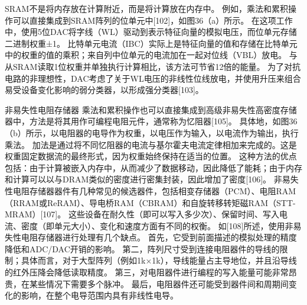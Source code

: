 SRAM不是将内存放在计算附近，而是将计算放在内存中。
例如，乘法和累积操作可以直接集成到SRAM阵列的位单元中[102]，如图36（a）所示。
在这项工作中，使用5位DAC将字线（WL）驱动到表示特征向量的模拟电压，而位单元存储二进制权重±1。
比特单元电流（IBC）实际上是特征向量的值和存储在比特单元中的权重的值的乘积；来自列中位单元的电流加在一起对位线（VBL）放电。
与从SRAM读取1位权重并单独执行计算相比，该方法可节省12倍的能量。
为了对抗电路的非理想性，DAC考虑了关于WL电压的非线性位线放电，并使用升压来组合易受设备变化影响的弱分类器，以形成强分类器[103]。

非易失性电阻存储器
乘法和累积操作也可以直接集成到高级非易失性高密度存储器中，方法是将其用作可编程电阻元件，通常称为忆阻器[105]。
具体地，如图36（b）所示，以电阻器的电导作为权重，以电压作为输入，以电流作为输出，执行乘法。
加法是通过将不同忆阻器的电流与基尔霍夫电流定律相加来完成的。这是权重固定数据流的最终形式，因为权重始终保持在适当的位置。
这种方法的优点包括：由于计算被嵌入内存中，从而减少了数据移动，因此降低了能耗；由于内存和计算可以以与DRAM类似的密度进行密集封装，因此增加了密度[106]。
非易失性电阻存储器器件有几种常见的候选器件，包括相变存储器（PCM）、电阻RAM（RRAM或ReRAM）、导电桥RAM（CBRAM）和自旋转移转矩磁RAM（STT-MRAM）[107]。
这些设备在耐久性（即可以写入多少次）、保留时间、写入电流、密度（即单元大小）、变化和速度方面有不同的权衡。
如[108]所述，使用非易失性电阻存储器进行处理有几个缺点。
首先，它受到前面描述的模拟处理的精度降低和ADC/DAC开销的影响。
第二，阵列尺寸受到连接电阻器件的导线的限制；具体而言，对于大型阵列（例如1k×1k），导线能量占主导地位，并且沿导线的红外压降会降低读取精度。
第三，对电阻器件进行编程的写入能量可能非常昂贵，在某些情况下需要多个脉冲。
最后，电阻器件还可能受到器件间和周期间变化的影响，在整个电导范围内具有非线性电导。



